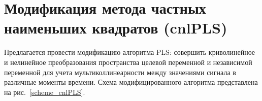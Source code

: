 \documentclass[12pt,twoside]{article}
\begin{document}




\newpage
\section{Модификация метода частных наименьших квадратов (cnlPLS)}
Предлагается провести модификацию алгоритма PLS: совершить криволинейное и нелинейное преобразования пространства целевой переменной  и независимой переменной для учета мультиколлинеарности между значениями сигнала в различные моменты времени. Схема модифицированного алгоритма представлена на рис.~\ref{scheme_cnlPLS}. 

\end{document}
